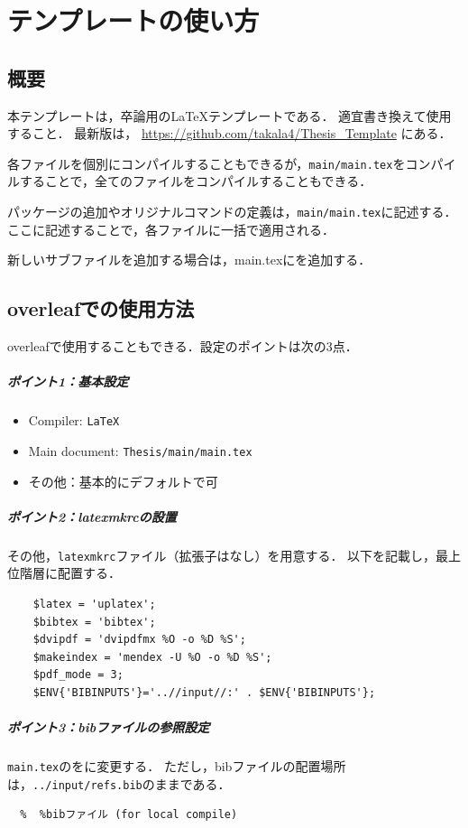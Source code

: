 \documentclass[../main/main]{subfiles}
\begin{document}
\chapter{テンプレートの使い方}
\section{概要}
本テンプレートは，卒論用の\LaTeX テンプレートである．
適宜書き換えて使用すること．
最新版は，
\url{https://github.com/takala4/Thesis_Template}
にある．
\par
各ファイルを個別にコンパイルすることもできるが，\verb|main/main.tex|をコンパイルすることで，全てのファイルをコンパイルすることもできる．
\par
パッケージの追加やオリジナルコマンドの定義は，\verb|main/main.tex|に記述する．ここに記述することで，各ファイルに一括で適用される．
\par
新しいサブファイルを追加する場合は，main.texに\verb||を追加する．


\newpage
\section{overleafでの使用方法}\label{sec:1_overleaf}
overleafで使用することもできる．設定のポイントは次の3点．
\paragraph{ポイント1：基本設定}
\begin{itemize}
  \item Compiler: \verb|LaTeX|
  \item Main document: \verb|Thesis/main/main.tex|
  \item その他：基本的にデフォルトで可
\end{itemize}
\paragraph{ポイント2：latexmkrcの設置}
その他，\verb|latexmkrc|ファイル（拡張子はなし）を用意する．
以下を記載し，最上位階層に配置する．
\begin{lstlisting}
    $latex = 'uplatex';
    $bibtex = 'bibtex';
    $dvipdf = 'dvipdfmx %O -o %D %S';
    $makeindex = 'mendex -U %O -o %D %S';
    $pdf_mode = 3;
    $ENV{'BIBINPUTS'}='..//input//:' . $ENV{'BIBINPUTS'};
\end{lstlisting}
\paragraph{ポイント3：bibファイルの参照設定}
\verb|main.tex|の\verb||を\verb||に変更する．
ただし，bibファイルの配置場所は，\verb|../input/refs.bib|のままである．
\begin{lstlisting}[language={[latex]TeX}]
   %bibファイル (for overleaf)
  %  %bibファイル (for local compile)
\end{lstlisting}
\end{document}
